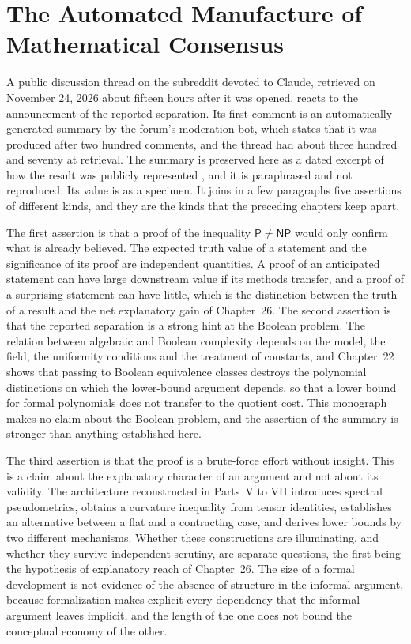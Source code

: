 \documentclass[11pt,letterpaper]{report}
\theoremstyle{plain}
\theoremstyle{definition}
\theoremstyle{remark}
\begin{document}
\section{The Automated Manufacture of Mathematical Consensus}

A public discussion thread on the subreddit devoted to Claude, retrieved on November 24, 2026 about fifteen hours after it was opened, reacts to the announcement of the reported separation. Its first comment is an automatically generated summary by the forum's moderation bot, which states that it was produced after two hundred comments, and the thread had about three hundred and seventy at retrieval. The summary is preserved here as a dated excerpt of how the result was publicly represented \cite{ClaudeAIThread2026}, and it is paraphrased and not reproduced. Its value is as a specimen. It joins in a few paragraphs five assertions of different kinds, and they are the kinds that the preceding chapters keep apart.

The first assertion is that a proof of the inequality $\mathsf P\ne\mathsf{NP}$ would only confirm what is already believed. The expected truth value of a statement and the significance of its proof are independent quantities. A proof of an anticipated statement can have large downstream value if its methods transfer, and a proof of a surprising statement can have little, which is the distinction between the truth of a result and the net explanatory gain of Chapter~26. The second assertion is that the reported separation is a strong hint at the Boolean problem. The relation between algebraic and Boolean complexity depends on the model, the field, the uniformity conditions and the treatment of constants, and Chapter~22 shows that passing to Boolean equivalence classes destroys the polynomial distinctions on which the lower-bound argument depends, so that a lower bound for formal polynomials does not transfer to the quotient cost. This monograph makes no claim about the Boolean problem, and the assertion of the summary is stronger than anything established here.

The third assertion is that the proof is a brute-force effort without insight. This is a claim about the explanatory character of an argument and not about its validity. The architecture reconstructed in Parts~V to VII introduces spectral pseudometrics, obtains a curvature inequality from tensor identities, establishes an alternative between a flat and a contracting case, and derives lower bounds by two different mechanisms. Whether these constructions are illuminating, and whether they survive independent scrutiny, are separate questions, the first being the hypothesis of explanatory reach of Chapter~26. The size of a formal development is not evidence of the absence of structure in the informal argument, because formalization makes explicit every dependency that the informal argument leaves implicit, and the length of the one does not bound the conceptual economy of the other.
\end{document}
